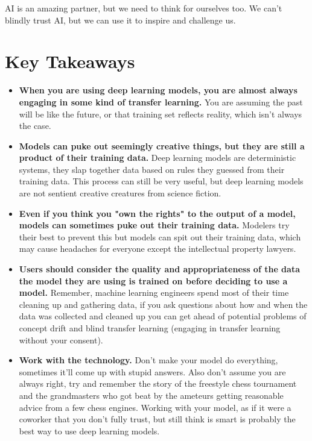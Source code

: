 AI is an amazing partner, but we need to think for ourselves too. We can’t blindly trust AI, but we can use it to inspire and challenge us.

\section{Key Takeaways}

\begin{itemize}
    \item \textbf{When you are using deep learning models, you are almost always engaging in some kind of transfer learning.} You are assuming the past will be like the future, or that training set reflects reality, which isn't always the case. 
    \item \textbf{Models can puke out seemingly creative things, but they are still a product of their training data.} Deep learning models are deterministic systems, they slap together data based on rules they guessed from their training data. This process can still be very useful, but deep learning models are not sentient creative creatures from science fiction.
    \item \textbf{Even if you think you "own the rights" to the output of a model, models can sometimes puke out their training data.} Modelers try their best to prevent this but models can spit out their training data, which may cause headaches for everyone except the intellectual property lawyers. 
    \item \textbf{Users should consider the quality and appropriateness of the data the model they are using is trained on before deciding to use a model.} Remember, machine learning engineers spend most of their time cleaning up and gathering data, if you ask questions about how and when the data was collected and cleaned up you can get ahead of potential problems of concept drift and blind transfer learning (engaging in transfer learning without your consent).
    \item \textbf{Work with the technology.} Don't make your model do everything, sometimes it'll come up with stupid answers. Also don't assume you are always right, try and remember the story of the freestyle chess tournament and the grandmasters who got beat by the ameteurs getting reasonable advice from a few chess engines. Working with your model, as if it were a coworker that you don't fully trust, but still think is smart is probably the best way to use deep learning models.
\end{itemize}

